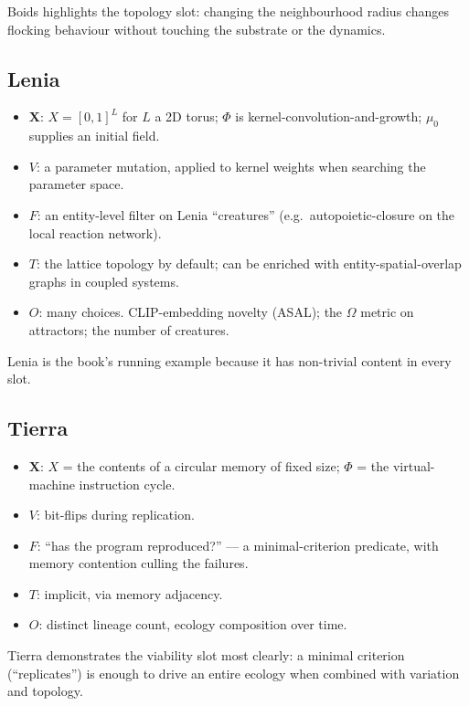 Boids highlights the topology slot: changing the neighbourhood radius
changes flocking behaviour without touching the substrate or the
dynamics.

\subsection*{Lenia}

\begin{itemize}[leftmargin=1.5em,itemsep=2pt]
  \item $\mathbf{X}$: $X = [0,1]^L$ for $L$ a 2D torus; $\Phi$ is
    kernel-convolution-and-growth; $\mu_0$ supplies an initial field.
  \item $V$: a parameter mutation, applied to kernel weights when
    searching the parameter space.
  \item $F$: an entity-level filter on Lenia ``creatures'' (e.g.\
    autopoietic-closure on the local reaction network).
  \item $T$: the lattice topology by default; can be enriched with
    entity-spatial-overlap graphs in coupled systems.
  \item $O$: many choices. CLIP-embedding novelty (ASAL); the $\Omega$
    metric on attractors; the number of creatures.
\end{itemize}

Lenia is the book's running example because it has non-trivial content
in every slot.

\subsection*{Tierra}

\begin{itemize}[leftmargin=1.5em,itemsep=2pt]
  \item $\mathbf{X}$: $X$ = the contents of a circular memory of fixed
    size; $\Phi$ = the virtual-machine instruction cycle.
  \item $V$: bit-flips during replication.
  \item $F$: ``has the program reproduced?'' --- a minimal-criterion
    predicate, with memory contention culling the failures.
  \item $T$: implicit, via memory adjacency.
  \item $O$: distinct lineage count, ecology composition over time.
\end{itemize}

Tierra demonstrates the viability slot most clearly: a minimal
criterion (``replicates'') is enough to drive an entire ecology when
combined with variation and topology.


